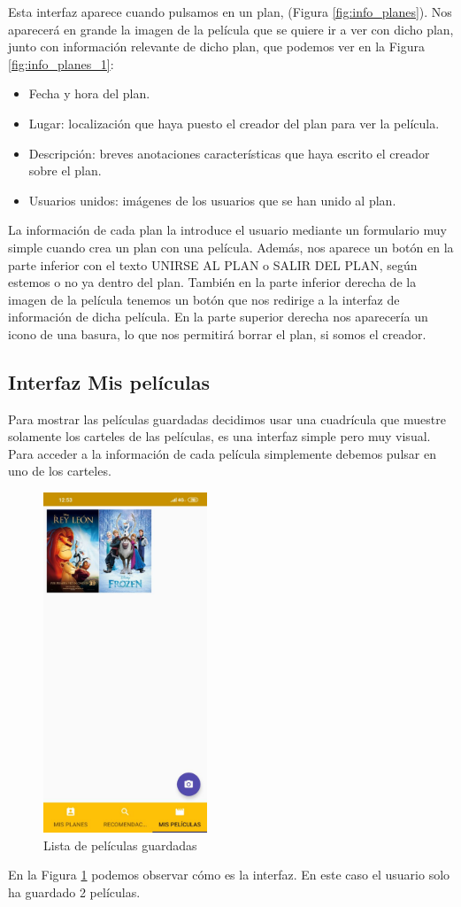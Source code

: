 Esta interfaz aparece cuando pulsamos en un plan, (Figura \ref{fig:info_planes}). Nos aparecerá en grande la imagen de la película que se quiere ir a ver con dicho plan, junto con información
relevante de dicho plan, que podemos ver en la Figura \ref{fig:info_planes_1}:
\begin{itemize}
    \item Fecha y hora del plan.
    \item Lugar: localización que haya puesto el creador del plan para ver la película.
    \item Descripción: breves anotaciones características que haya escrito el creador sobre el plan.
    \item Usuarios unidos: imágenes de los usuarios que se han unido al plan.
\end{itemize}
\vspace{1cm}

La información de cada plan la introduce el usuario mediante un formulario muy simple cuando crea un plan con una película.
Además, nos aparece un botón en la parte inferior con el texto UNIRSE AL PLAN o SALIR DEL PLAN, según estemos o no ya dentro del plan.
También en la parte inferior derecha de la imagen de la película tenemos un botón que nos redirige a la interfaz de información de dicha película.
En la parte superior derecha nos aparecería un icono de una basura, lo que nos permitirá borrar el plan, si somos el creador.

\subsection{Interfaz Mis películas}
\label{makereference3.4.4}
Para mostrar las películas guardadas decidimos usar una cuadrícula que muestre solamente los carteles de las películas, es una interfaz simple pero muy visual. Para acceder a la información
de cada película simplemente debemos pulsar en uno de los carteles.
\begin{figure}[H]
    \centering
    \includegraphics[height=4in]{figures/FilmsList.jpg}
    \caption{Lista de películas guardadas}
    \label{fig:lista_peliculas}
\end{figure}
En la Figura \ref{fig:lista_peliculas} podemos observar cómo es la interfaz. En este caso el usuario solo ha guardado 2 películas.
